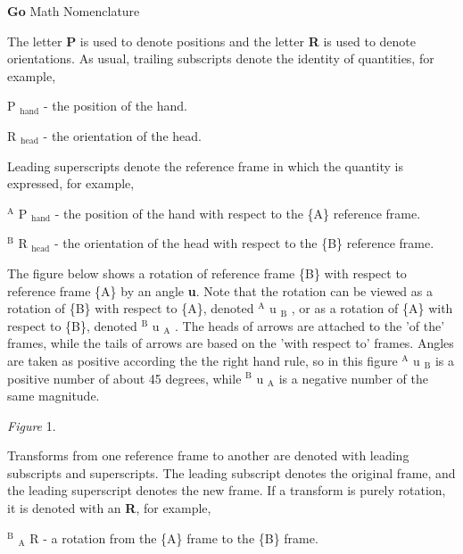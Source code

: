{\bfseries Go} Math Nomenclature

The letter {\bfseries P} is used to denote positions and the letter {\bfseries R} is used to denote orientations. As usual, trailing subscripts denote the identity of quantities, for example,

P
\footnotesize $_{\mbox{hand}}$ 
\normalsize  -\/ the position of the hand.

R
\footnotesize $_{\mbox{head}}$ 
\normalsize  -\/ the orientation of the head.

Leading superscripts denote the reference frame in which the quantity is expressed, for example,


\footnotesize $^{\mbox{A}}$ 
\normalsize P
\footnotesize $_{\mbox{hand}}$ 
\normalsize  -\/ the position of the hand with respect to the \{A\} reference frame.


\footnotesize $^{\mbox{B}}$ 
\normalsize R
\footnotesize $_{\mbox{head}}$ 
\normalsize  -\/ the orientation of the head with respect to the \{B\} reference frame.

The figure below shows a rotation of reference frame \{B\} with respect to reference frame \{A\} by an angle {\bfseries u}. Note that the rotation can be viewed as a rotation of \{B\} with respect to \{A\}, denoted 
\footnotesize $^{\mbox{A}}$ 
\normalsize u
\footnotesize $_{\mbox{B}}$ 
\normalsize , or as a rotation of \{A\} with respect to \{B\}, denoted 
\footnotesize $^{\mbox{B}}$ 
\normalsize u
\footnotesize $_{\mbox{A}}$ 
\normalsize . The heads of arrows are attached to the 'of the' frames, while the tails of arrows are based on the 'with respect to' frames. Angles are taken as positive according the the right hand rule, so in this figure 
\footnotesize $^{\mbox{A}}$ 
\normalsize u
\footnotesize $_{\mbox{B}}$ 
\normalsize  is a positive number of about 45 degrees, while 
\footnotesize $^{\mbox{B}}$ 
\normalsize u
\footnotesize $_{\mbox{A}}$ 
\normalsize  is a negative number of the same magnitude.

 \begin{center} {\itshape Figure} 1. \end{center} 

Transforms from one reference frame to another are denoted with leading subscripts and superscripts. The leading subscript denotes the original frame, and the leading superscript denotes the new frame. If a transform is purely rotation, it is denoted with an {\bfseries R}, for example,


\footnotesize $^{\mbox{B}}$ $_{\mbox{A}}$ 
\normalsize R -\/ a rotation from the \{A\} frame to the \{B\} frame.

